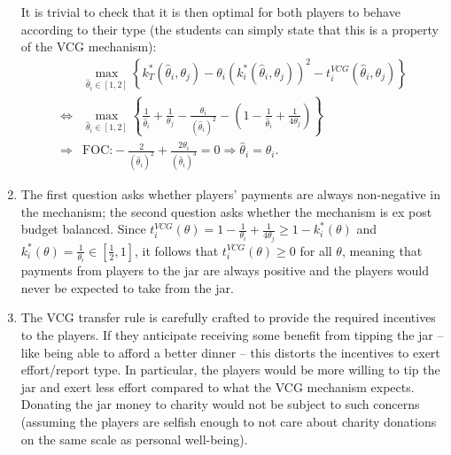 \documentclass[a4paper]{article}
\newif\ifsolutions
\begin{document}
\begin{enumerate}
	It is trivial to check that it is then optimal for both players to behave according to their type (the students can simply state that this is a property of the VCG mechanism):
	\begin{align*}
		&\max_{\hat{\theta}_i \in [1,2]} \left\{ k^*_T(\hat{\theta}_i,\theta_j) - \theta_i (k^*_i(\hat{\theta}_i,\theta_j))^2 - t_i^{VCG}(\hat{\theta}_i,\theta_j) \right\}
		\\ \iff
		&\max_{\hat{\theta}_i \in [1,2]} \left\{ \frac{1}{\hat{\theta}_i} + \frac{1}{\theta_j} - \frac{\theta_i}{\left(\hat{\theta}_i \right)^2} - \left( 1 - \frac{1}{\hat{\theta}_i } + \frac{1}{4\theta_j} \right) \right\}
		\\ \Rightarrow
		&\text{FOC:} -\frac{2}{\left( \hat{\theta}_i \right)^2} + \frac{2\theta_i}{\left( \hat{\theta}_i \right)^3} = 0
		\Rightarrow \hat{\theta}_i = \theta_i.
	\end{align*}

	\item The first question asks whether players' payments are always non-negative in the mechanism; the second question asks whether the mechanism is ex post budget balanced. Since $t_i^{VCG}(\theta) = 1-\frac{1}{\theta_i} + \frac{1}{4\theta_j} \geq 1-k^*_i(\theta)$ and $k_i^*(\theta) = \frac{1}{\theta_i} \in \left[ \frac{1}{2}, 1 \right]$, it follows that $t_i^{VCG}(\theta) \geq 0$ for all $\theta$, meaning that payments from players to the jar are always positive and the players would never be expected to take from the jar.
	
	\item The VCG transfer rule is carefully crafted to provide the required incentives to the players. If they anticipate receiving some benefit from tipping the jar -- like being able to afford a better dinner -- this distorts the incentives to exert effort/report type. In particular, the players would be more willing to tip the jar and exert less effort compared to what the VCG mechanism expects. Donating the jar money to charity would not be subject to such concerns (assuming the players are selfish enough to not care about charity donations on the same scale as personal well-being).
\end{enumerate}
\fi



%
%
%
\end{document}
